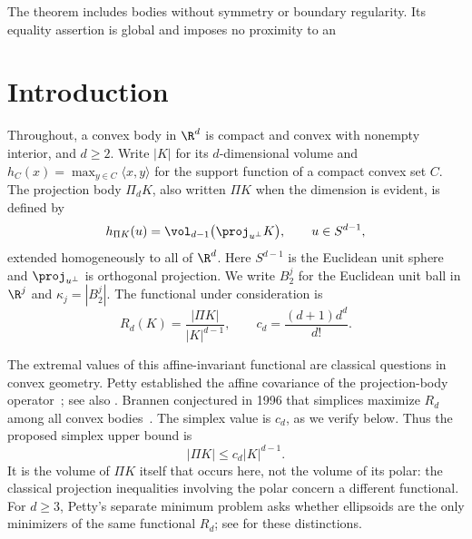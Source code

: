 The theorem includes bodies without symmetry or boundary regularity.
Its equality assertion is global and imposes no proximity to an

\begin{abstract}
The product of two ten-dimensional simplices has larger normalized
projection-body volume than a twenty-dimensional simplex. This gives
a counterexample to Brannen's proposed simplex maximum.
\end{abstract}
\section{Introduction}

Throughout, a convex body in \(\R^d\) is compact and convex with nonempty
interior, and \(d\ge2\). Write \(|K|\) for its \(d\)-dimensional
volume and \(h_C(x)=\max_{y\in C}\langle x,y\rangle\) for the support
function of a compact convex set \(C\). The projection body
\(\Pi_d K\), also written \(\Pi K\) when the dimension is evident, is
defined by
\[
 h_{\Pi K}(u)=\vol_{d-1}\bigl(\proj_{u^\perp}K\bigr),
 \qquad u\in S^{d-1},
\]
extended homogeneously to all of \(\R^d\). Here \(S^{d-1}\) is the
Euclidean unit sphere and \(\proj_{u^\perp}\) is orthogonal projection.
We write \(B_2^j\) for the Euclidean unit ball in \(\R^j\) and
\(\kappa_j=|B_2^j|\).
The functional under consideration is
\begin{equation}\label{eq:functional}
 R_d(K)=\frac{|\Pi K|}{|K|^{d-1}},
 \qquad c_d=\frac{(d+1)d^d}{d!}.
\end{equation}

The extremal values of this affine-invariant functional are classical
questions in convex geometry. Petty established the affine covariance of
the projection-body operator~\cite{Petty}; see also
\cite[Equation~(1)]{Ludwig}. Brannen conjectured in 1996 that simplices
maximize \(R_d\) among all convex bodies~\cite{Brannen}.
The simplex value is \(c_d\), as we verify below. Thus the proposed
simplex upper bound is
\begin{equation}\label{eq:proposed-bound}
 |\Pi K|\le c_d|K|^{d-1}.
\end{equation}
It is the volume of \(\Pi K\) itself that occurs here, not the volume of
its polar: the classical projection inequalities involving the polar
concern a different functional. For \(d\ge3\), Petty's separate minimum
problem asks whether ellipsoids are the only minimizers of the same
functional \(R_d\); see \cite[Section~1]{Saroglou} for these distinctions.

